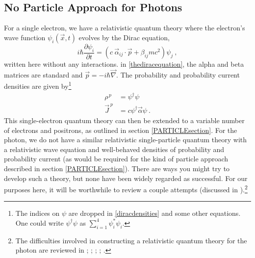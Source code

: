 \documentclass[12pt,onecolumn,secnumarabic,amsmath,amssymb,balancelastpage,nofootinbib]{article}
\newcommand{\del}[0]{\ensuremath{\vec{\nabla}}}
\begin{document}
\subsection{No Particle Approach for Photons}\label{PHOTONSsection}

For a single electron, we have a relativistic quantum theory where the electron's wave function $\psi_i(\vec{x},t)$ evolves by the Dirac equation,
\begin{equation}
i\hbar \frac{\partial \psi_i}{\partial t}=\left(c\:\vec{\alpha}_{ij}\cdot\vec{p}+\beta_{ij} m c^2 \right)\psi_j
\ ,
\label{thediracequation}
\end{equation}
written here without any interactions.  in \eqref{thediracequation}, the alpha and beta matrices are standard and $\vec{p}=-i\hbar\del$.  The probability and probability current densities are given by\footnote{The indices on $\psi$ are dropped in \eqref{diracdensities} and some other equations.  One could write $\psi^\dagger \psi$ as $\sum_{i=1}^4 \psi_i^*\psi_i$.}
\begin{align}
\rho^{\,p}&=\psi^\dagger \psi
\nonumber
\\
\vec{J}^{\:p}&=c \psi^\dagger \vec{\alpha} \psi
\ .
\label{diracdensities}
\end{align}
This single-electron quantum theory can then be extended to a variable number of electrons and positrons, as outlined in section \ref{PARTICLEsection}.  For the photon, we do not have a similar relativistic single-particle quantum theory with a relativistic wave equation and well-behaved densities of probability and probability current (as would be required for the kind of particle approach described in section \ref{PARTICLEsection}).  There are ways you might try to develop such a theory, but none have been widely regarded as successful.  For our purposes here, it will be worthwhile to review a couple attempts (discussed in \citealp{emasqp}).\footnote{The difficulties involved in constructing a relativistic quantum theory for the photon are reviewed in \citet[sec.\ II.5.2]{bohm1987}; \citet{holland1993}; \citet[sec.\ 12.6]{holland}; \citet{kiessling2018}; \citet[sec.\ 7.4]{valentini2020}.}
\end{document}
